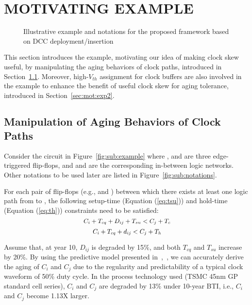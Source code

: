 \section{MOTIVATING EXAMPLE}
\label{sec:motivate}
\begin{figure*}[!ht]
    \centering
    \hspace{1.6cm}
    \caption{Illustrative example and notations for the proposed framework based on DCC deployment/insertion}
    \label{fig:en}
\end{figure*}


This section introduces the example, motivating our idea of making clock skew useful, by manipulating the aging behaviors of clock paths, introduced in Section~\ref{sec:mot:exp1}. Moreover, high-$V_{th}$ assignment for clock buffers are also involved in the example to enhance the benefit of useful clock skew for aging tolerance, introduced in Section~\ref{sec:mot:exp2}. 

\subsection{Manipulation of Aging Behaviors of Clock Paths}
\label{sec:mot:exp1}
Consider the circuit in Figure~\ref{fig:sub:example} where ,  and  are three edge-triggered flip-flops, and  and  are the corresponding in-between logic networks. Other notations to be used later are listed in Figure~\ref{fig:sub:notations}.

For each pair of flip-flops (e.g.,  and ) between which there exists at least one logic path from  to , the following setup-time (Equation (\ref{eq:tsu})) and hold-time (Equation (\ref{eq:th})) constraints need to be satisfied:
\begin{equation}
	\mbox{\fontsize{9}{9.6} $C_i+T_{cq}+D_{ij}+T_{su}<C_j+T_c$}
	\label{eq:tsu}
\end{equation}
\begin{equation}
	\mbox{\fontsize{9}{9.6} $C_i+T_{cq}+d_{ij}<C_j+T_h$}
	\label{eq:th}
\end{equation}

Assume that, at year 10, $D_{ij}$ is degraded by 15\%, and both $T_{cq}$ and $T_{su}$ increase by 20\%. By using the predictive model presented in~\cite{wang2010impact},~\cite{wang2007efficient}, we can accurately derive the aging of $C_i$ and $C_j$ due to the regularity and predictability of a typical clock waveform of 50\% duty cycle. In the process technology used (TSMC 45nm GP standard cell series), $C_i$ and $C_j$ are degraded by 13\% under 10-year BTI, i.e., $C_i$ and $C_j$ become 1.13X larger.

